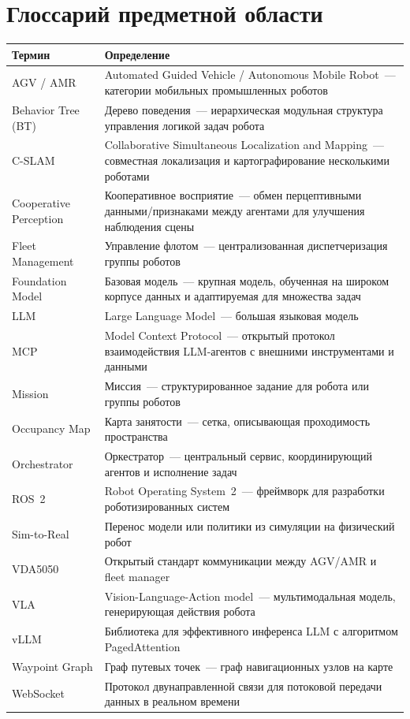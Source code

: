 \documentclass[14pt,a4paper]{extreport}
\providecommand{\Asbuk}[1]{%
  \ifcase\value{#1}\or А\or Б\or В\or Г\or Д\or Е\or Ж\or З\or И\or К%
  \or Л\or М\or Н\or О\or П\or Р\or С\or Т\or У\or Ф\fi
}
\begin{document}
\appendix
\renewcommand{\thechapter}{\Asbuk{chapter}}

\chapter{Глоссарий предметной области}

\begin{longtable}{p{3.5cm}p{10cm}}
\toprule
\textbf{Термин} & \textbf{Определение} \\
\midrule
\endhead
AGV / AMR & Automated Guided Vehicle / Autonomous Mobile Robot~--- категории мобильных промышленных роботов \\
Behavior Tree (BT) & Дерево поведения~--- иерархическая модульная структура управления логикой задач робота \\
C-SLAM & Collaborative Simultaneous Localization and Mapping~--- совместная локализация и картографирование несколькими роботами \\
Cooperative Perception & Кооперативное восприятие~--- обмен перцептивными данными/признаками между агентами для улучшения наблюдения сцены \\
Fleet Management & Управление флотом~--- централизованная диспетчеризация группы роботов \\
Foundation Model & Базовая модель~--- крупная модель, обученная на широком корпусе данных и адаптируемая для множества задач \\
LLM & Large Language Model~--- большая языковая модель \\
MCP & Model Context Protocol~--- открытый протокол взаимодействия LLM-агентов с внешними инструментами и данными \\
Mission & Миссия~--- структурированное задание для робота или группы роботов \\
Occupancy Map & Карта занятости~--- сетка, описывающая проходимость пространства \\
Orchestrator & Оркестратор~--- центральный сервис, координирующий агентов и исполнение задач \\
ROS~2 & Robot Operating System~2~--- фреймворк для разработки роботизированных систем \\
Sim-to-Real & Перенос модели или политики из симуляции на физический робот \\
VDA5050 & Открытый стандарт коммуникации между AGV/AMR и fleet manager \\
VLA & Vision-Language-Action model~--- мультимодальная модель, генерирующая действия робота \\
vLLM & Библиотека для эффективного инференса LLM с алгоритмом PagedAttention \\
Waypoint Graph & Граф путевых точек~--- граф навигационных узлов на карте \\
WebSocket & Протокол двунаправленной связи для потоковой передачи данных в реальном времени \\
\bottomrule
\end{longtable}
\end{document}
